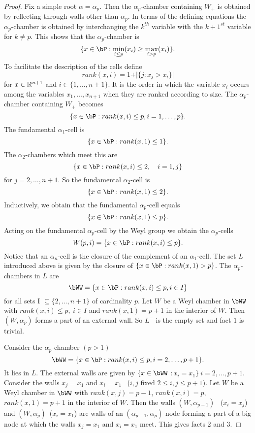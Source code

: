 \documentclass{memo-l}
\theoremstyle{definition}
\theoremstyle{remark}
\numberwithin{section}{chapter}
\numberwithin{equation}{chapter}
\begin{document}
\begin{proof}
   Fix a simple root ${\alpha} = {\alpha}_{p}$.  Then the
${\alpha}_{p}$-chamber containing $W_{+}$ is obtained by reflecting through
walls other than ${\alpha}_{p}$.  In terms of the defining equations the
${\alpha}_{p}$-chamber is obtained by interchanging the $k^{th}$ variable
with the $k+1^{st}$ variable for $k \ne p$.  This shows that the
${\alpha}_{p}$-chamber is
$$
\{x  \in  \bP: \min_{i \le  p} (x_{i}) \ge \max_{i > p} (x_{i})\}.
$$
To facilitate the description of the cells define 
$$
rank(x,i) = 1 + \vert \{j: x_{j} > x_{i}\}\vert
$$
for $x  \in  {\Bbb R^{n+1}}$ and $i  \in  \{1,\ldots ,n+1\}$.  It is
the order in which the variable $x_{i}$ occurs among the variables
$x_{1},\ldots ,x_{n+1}$ when they are ranked according to size.  The
${\alpha}_{p}$-chamber containing $W_{+}$ becomes
$$
\{x  \in  \bP: rank(x,i) \le p, i = 1,\ldots ,p\}.
$$
The fundamental ${\alpha}_{1}$-cell is
$$
\{x  \in  \bP: rank(x,1) \le 1\}.
$$
The ${\alpha}_{2}$-chambers which meet this are
$$
\{x  \in  \bP: rank(x,i) \le 2,\quad i = 1,j\}
$$
for $j = 2,\ldots ,n+1$.  So the fundamental ${\alpha}_{2}$-cell is
$$
\{x  \in  \bP: rank(x,1) \le 2\}.
$$
Inductively, we obtain that the fundamental ${\alpha}_{p}$-cell equals
$$
\{x  \in  \bP: rank(x,1) \le p\}.
$$
Acting on the fundamental ${\alpha}_{p}$-cell by the Weyl group we obtain
the ${\alpha}_{p}$-cells
$$
W(p,i) = \{x  \in  \bP: rank(x,i) \le p\}.
$$
Notice that an ${\alpha}_{n}$-cell is the closure of the complement of an
${\alpha}_{1}$-cell.  The set $L$ introduced above is given by the closure
of $\{x  \in  \bP: rank(x,1)>p\}$.  The ${\alpha}_{p}$-chambers in $L$
are
$$
\bWW = \{x  \in  \bP: rank(x,i) \le p, i  \in  I\}
$$
for all sets I ${\subseteq} \{2,\ldots ,n+1\}$ of cardinality $p$.  Let $W$
be a Weyl chamber in $\bWW$ with $rank(x,i) \le p,\
i  \in  I$ and
$rank(x,1) = p+1$ in the interior of $W$.  Then $(W,{\alpha}_{p})$ forms a
part of an external wall.  So $L^{-}$ is the empty set and fact $1$ is
trivial.

   Consider the ${\alpha}_{p}$-chamber $(p > 1)$
$$
\bWW = \{x  \in  \bP: rank(x,i) \le p, i = 2,\ldots ,p+1\}.
$$
It lies in $L$.  The external walls are given by $\{x  \in \bWW$
$:x_{i} = x_{1}\}\  i = 2,\ldots ,p+1$.  Consider the walls $x_{j} = x_{1}$ and
$x_{i} = x_{1}$ \ ($i,j$ fixed $2 \le i,j \le p+1)$.  Let $W$ be a Weyl
chamber in $\bWW$ with $rank(x,j) = p-1$, $rank(x,i) = p$, 
$rank(x,1) = p+1$ in the
interior of $W$.  Then the walls $(W,{\alpha}_{p-1})$ \ ($x_{i}  = x_{j}$) and
$(W,{\alpha}_{p})$\  ($x_{i} = x_{1}$) are walls of an
$({\alpha}_{p-1},{\alpha}_{p})$ node forming a part of a big node at which
the walls $x_{j} = x_{1}$ and $x_{i} = x_{1}$ meet.  This gives facts $2$ and
$3$.


\end{proof}
\end{document}
